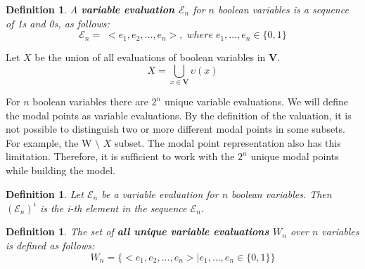 \documentclass{article}
\newcommand\E{\mathcal{E}}
\newcommand\Vb{\mathbf{V}}
\newtheorem{defn}[theorem]{Definition}
\begin{document}
		\begin{defn}
			A \textbf{variable evaluation $\E_n$} for $n$ boolean variables is a sequence of 1s and 0s, as follows:
			\begin{equation}
				\E_n = \; < e_1, e_2, \ldots , e_n >, \; where \; e_1, \ldots, e_n \in \{0, 1 \}
			\end{equation}
		\end{defn}

		Let $X$ be the union of all evaluations of boolean variables in $\Vb$.
		\begin{equation}
			\label{X-all-variable-valuations}
			X = \bigcup\limits_{x \in \Vb}\upsilon(x)
		\end{equation}

		For $n$ boolean variables there are $2^n$ unique variable evaluations. We will define the modal points as variable evaluations. By the definition of the valuation, it is not possible to distinguish two or more different modal points in some subsets. For example, the W $\setminus$ $X$ subset. The modal point representation also has this limitation. Therefore, it is sufficient to work with the $2^n$ unique modal points while building the model.

		\begin{defn}
			Let $\E_n$ be a variable evaluation for $n$ boolean variables. Then $(\E_n)^i$ is the i-th element in the sequence $\E_n$.
		\end{defn}

		\begin{defn}
			The set of \textbf{all unique variable evaluations $W_n$} over $n$ variables is defined as follows:
			\begin{equation}
				\label{all-unique-points}
				W_n = \{< e_1, e_2, \ldots , e_n > \mid e_1, \ldots, e_n \in \{0, 1 \} \}
			\end{equation}
		\end{defn}
\end{document}
